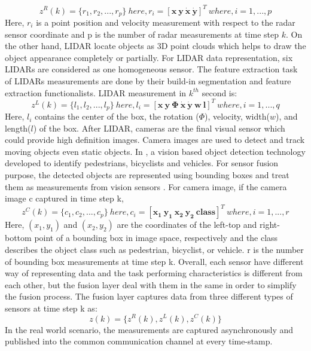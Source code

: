 \begin{equation}
z^{R}(k) = \{r_{1},r_{2},...,r_{p}\} \ here, r_{i} = [\mathbf {x \ y \ \dot{x} \ \dot{y}}]^{T} \ where, i = 1, ...,p
\end{equation}
Here, $r_{i}$ is a point position and velocity measurement with respect to the radar sensor coordinate and p is the number of radar measurements at time step $k$.
On the other hand, LIDAR locate objects as 3D point clouds which helps to draw the object appearance completely or partially. For LIDAR data representation, six LIDARs are considered as one homogeneous sensor. The feature extraction task of LIDARs measurements are done by their build-in segmentation and feature extraction functionalists\cite{Cho_2014}. LIDAR measurement in $k^{th}$ second  is:
\begin{equation}
z^{L}(k) = \{l_{1},l_{2},...,l_{p}\} \ here, l_{i} = [\mathbf {x \ y \ \Phi \ \dot{x} \ \dot{y} \ w \ l}]^{T} \ where, i = 1, ...,q
\end{equation}
Here, $l_{i}$ contains the center of the box, the rotation ($\Phi$), velocity, width($w$), and length($l$) of the box. After LIDAR, cameras are the final visual sensor which could provide high definition images. Camera images are used to detect and track moving objects even static objects. In \cite{Cho_2014}, a vision based object detection technology developed to identify pedestrians, bicyclists and vehicles\cite{Cho_2014}. For sensor fusion purpose, the detected objects are represented using bounding boxes and treat them as measurements from vision sensors \cite{Cho_2014}. For camera image, if the camera image c captured in time step k,
\begin{equation}
z^{C}(k) = \{c_{1},c_{2},...,c_{p}\} \ here, c_{i} = [\mathbf {x_{1} \ y_{1} \ x_{2} \ y_{2} \ class}]^{T} \ where, i = 1, ...,r
\end{equation}
Here, $(x_{1} , y_{1})$ and $(x_{2} , y_{2})$ are the coordinates of the left-top and right-bottom point of a bounding box in image space, respectively and the class describes the object class such as pedestrian, bicyclist, or vehicle. r is the number of bounding box measurements at time step k.
Overall, each sensor have different way of representing data and the task performing characteristics is different from each other, but the fusion layer deal with them in the same in order to simplify the fusion process. The fusion layer captures data from three different types of sensors at time step k as:
\begin{equation}
z(k) = \{z^{R}(k), z^{L}(k), z^{C}(k)\}
\end{equation}
In the real world scenario, the measurements are captured asynchronously and published into the common communication channel at every time-stamp.

